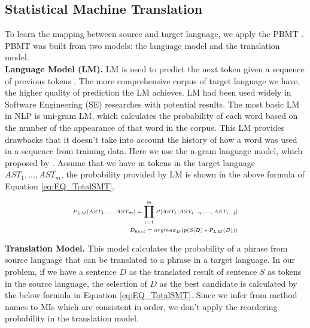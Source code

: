 \subsection{Statistical Machine Translation}
To learn the mapping between source and target language, we apply the PBMT \cite{Green2014}. PBMT was built from two models: the language model and the translation model.
\\
\textbf{Language Model (LM).}  LM is used to predict the next token given a sequence of previous tokens \cite{Koehn:2003:SPT:1073445.1073462}. The more comprehensive corpus of target language we have, the higher quality of prediction the LM achieves. LM had been used widely in Software Engineering (SE) researches \cite{Hindle:2012:NS:2337223.2337322,Hel:7180076,Liu:7883371} with potential results. The most basic LM in NLP is uni-gram LM, which calculates the probability of each word based on the number of the appearance of that word in the corpus. This LM provides drawbacks that it doesn't take into account the history of how a word was used in a sequence from training data.  Here we use the n-gram language model, which proposed by \cite{Jurafsky:2009:SLP:1214993}. Assume that we have m tokens in the target language \({AST_{1},...,AST_{m}}\), the probability provided by LM is shown in the above formula of Equation \ref{eq:EQ_TotalSMT}.

\begin{equation} 
\tiny
\label{eq:EQ_TotalSMT}
\begin{split}
    P_{LM}[AST_{1}, ...,AST_{m}]=\prod_{i=1}^{m}P[AST_{i} | AST_{i-n},...,AST_{i-1}] \\
    D_{best}=argmax_{D}(p(S|D)*P_{LM}(D)))   
  \end{split}
\end{equation}

\textbf{Translation Model.} This model calculates the probability of a phrase from source language that can be translated to a phrase in a target language. In our problem, if we have a sentence   \({D}\) as the translated result of sentence \({S}\) as tokens in the source language, the selection of \({D}\) as the best candidate is calculated by the below formula in Equation \ref{eq:EQ_TotalSMT}. Since we infer from method names to MIs which are consistent in order, we don't apply the reordering probability in the translation model.



